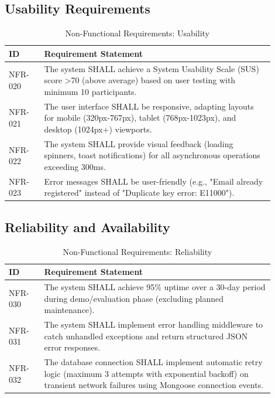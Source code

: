 \documentclass[12pt, a4paper]{report}
\begin{document}
\subsection{Usability Requirements}

\begin{table}[H]
\centering
\caption{Non-Functional Requirements: Usability}
\label{tab:nfr_usability}
\small
\begin{tabular}{@{}p{0.12\linewidth}p{0.78\linewidth}@{}}
\toprule
\textbf{ID} & \textbf{Requirement Statement} \\
\midrule
NFR-020 & The system SHALL achieve a System Usability Scale (SUS) score \textgreater 70 (above average) based on user testing with minimum 10 participants. \\
NFR-021 & The user interface SHALL be responsive, adapting layouts for mobile (320px-767px), tablet (768px-1023px), and desktop (1024px+) viewports. \\
NFR-022 & The system SHALL provide visual feedback (loading spinners, toast notifications) for all asynchronous operations exceeding 300ms. \\
NFR-023 & Error messages SHALL be user-friendly (e.g., "Email already registered" instead of "Duplicate key error: E11000"). \\
\bottomrule
\end{tabular}
\end{table}

\subsection{Reliability and Availability}

\begin{table}[H]
\centering
\caption{Non-Functional Requirements: Reliability}
\label{tab:nfr_reliability}
\small
\begin{tabular}{@{}p{0.12\linewidth}p{0.78\linewidth}@{}}
\toprule
\textbf{ID} & \textbf{Requirement Statement} \\
\midrule
NFR-030 & The system SHALL achieve 95\% uptime over a 30-day period during demo/evaluation phase (excluding planned maintenance). \\
NFR-031 & The system SHALL implement error handling middleware to catch unhandled exceptions and return structured JSON error responses. \\
NFR-032 & The database connection SHALL implement automatic retry logic (maximum 3 attempts with exponential backoff) on transient network failures using Mongoose connection events. \\
\bottomrule
\end{tabular}
\end{table}
\end{document}
